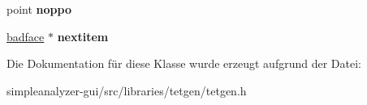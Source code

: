 \begin{DoxyCompactItemize}
\item 
\hypertarget{classtetgenmesh_1_1badface_ada4ec358fcf9261b2f14cff307e66fdf}{point {\bfseries noppo}}\label{classtetgenmesh_1_1badface_ada4ec358fcf9261b2f14cff307e66fdf}

\item 
\hypertarget{classtetgenmesh_1_1badface_ae87a801b03dbaa3dd5709ffed5eef5bc}{\hyperlink{classtetgenmesh_1_1badface}{badface} $\ast$ {\bfseries nextitem}}\label{classtetgenmesh_1_1badface_ae87a801b03dbaa3dd5709ffed5eef5bc}

\end{DoxyCompactItemize}


Die Dokumentation für diese Klasse wurde erzeugt aufgrund der Datei\-:\begin{DoxyCompactItemize}
\item 
simpleanalyzer-\/gui/src/libraries/tetgen/tetgen.\-h\end{DoxyCompactItemize}
